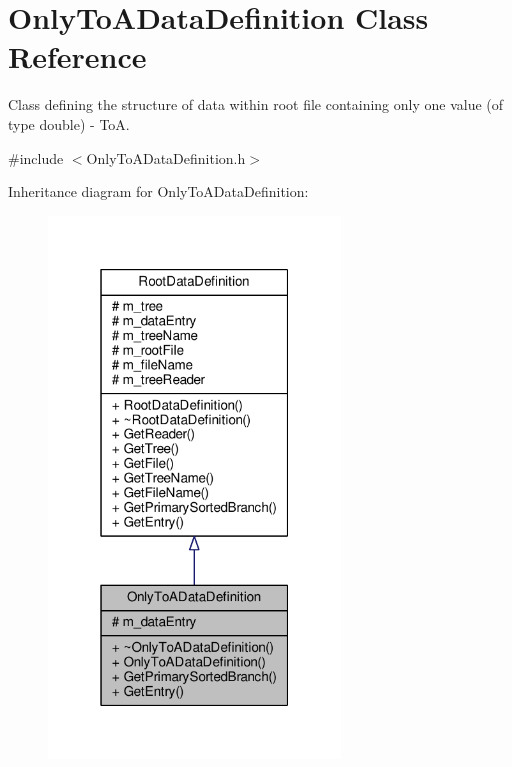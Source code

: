 \hypertarget{classOnlyToADataDefinition}{\section{Only\+To\+A\+Data\+Definition Class Reference}
\label{classOnlyToADataDefinition}
}


Class defining the structure of data within root file containing only one value (of type double) -\/ To\+A.  




{\ttfamily \#include $<$Only\+To\+A\+Data\+Definition.\+h$>$}



Inheritance diagram for Only\+To\+A\+Data\+Definition\+:\nopagebreak
\begin{figure}[H]
\begin{center}
\leavevmode
\includegraphics[width=220pt]{classOnlyToADataDefinition__inherit__graph}
\end{center}
\end{figure}


